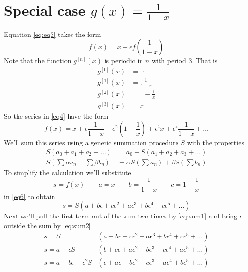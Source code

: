 \documentclass[a4paper]{article}
\begin{document}
\section{Special case $g(x) = \frac{1}{1-x}$}

Equation \eqref{eq:eq3} takes the form
\begin{equation}\label{eq5}
f(x) = x + \epsilon f(\frac{1}{1-x})
\end{equation}
Note that the function $g^{[n]}(x)$ is periodic in $n$ with period 3. That is
\begin{align*}
g^{[0]}(x) &= x\\
g^{[1]}(x) &= \frac{1}{1-x}\\
g^{[2]}(x) &= 1 - \frac{1}{x}\\
g^{[3]}(x) &= x
\end{align*}
So the series in \eqref{eq4} have the form
\begin{equation}\label{eq6}
f(x) = x + \epsilon \frac{1}{1-x} + \epsilon^2 (1 - \frac{1}{x}) + \epsilon^3 x + \epsilon^4 \frac{1}{1-x} + \dots
\end{equation}
We'll sum this series using a generic summation procedure $S$ with the properties
\begin{subequations}
\begin{align}
  S(a_0 + a_1 + a_2 + \dots) &= a_0 + S(a_1 + a_2 + a_3 + \dots)\label{eq:sum1}\\
  S(\sum{\alpha a_n} + \sum{\beta b_n}) &= \alpha S(\sum{a_n}) + \beta S(\sum{b_n})\label{eq:sum2}
\end{align}
\end{subequations}
To simplify the calculation we'll substitute
\begin{equation*}
s = f(x)
\qquad
a = x
\qquad
b = \frac{1}{1-x}
\qquad
c = 1 - \frac{1}{x}
\end{equation*}
in \eqref{eq6} to obtain
$$s = S(a + b \epsilon + c \epsilon^2 + a \epsilon^3 + b \epsilon^4 + c \epsilon^5 + \dots)$$
Next we'll pull the first term out of the sum two times by \eqref{eq:sum1} and bring $\epsilon$ outside the sum by \eqref{eq:sum2}
\begin{align*}
s = S&(a + b \epsilon + c \epsilon^2 + a \epsilon^3 + b \epsilon^4 + c \epsilon^5 + \dots)\\
s = a + \epsilon S&(b + c \epsilon + a \epsilon^2 + b\epsilon^3 + c\epsilon^4 + a \epsilon^5 + \dots)\\
s = a + b \epsilon + \epsilon^2 S&(c + a \epsilon + b\epsilon^2 + c\epsilon^3 + a \epsilon^4 + b \epsilon^5+ \dots)\\
\end{align*}
\end{document}
